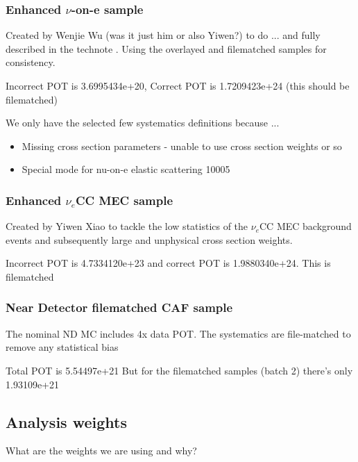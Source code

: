 \subsubsection*{Enhanced $\nu$-on-e sample}
Created by Wenjie Wu (was it just him or also Yiwen?) to do ... and fully described in the technote \cite{NOVA-doc-56383}. Using the overlayed and filematched samples for consistency.

Incorrect POT is 3.6995434e+20, Correct POT is 1.7209423e+24 (this should be filematched)

We only have the selected few systematics definitions because ... 

\begin{itemize}
\item Missing cross section parameters - unable to use cross section weights or so
\item Special mode for nu-on-e elastic scattering 10005
\end{itemize}

\subsubsection*{Enhanced $\nu_e$CC MEC sample}
Created by Yiwen Xiao \cite{NOVA-doc-56383} to tackle the low statistics of the $\nu_e$CC MEC background events and subsequently large and unphysical cross section weights.

Incorrect POT is 4.7334120e+23 and correct POT is 1.9880340e+24. This is filematched


\subsubsection*{Near Detector filematched CAF sample}

The nominal ND MC includes 4x data POT. The systematics are file-matched to remove any statistical bias

Total POT is 5.54497e+21
But for the filematched samples (batch 2) there's only 1.93109e+21

\subsection{Analysis weights}\label{sec:anaWeights}
What are the weights we are using and why?

